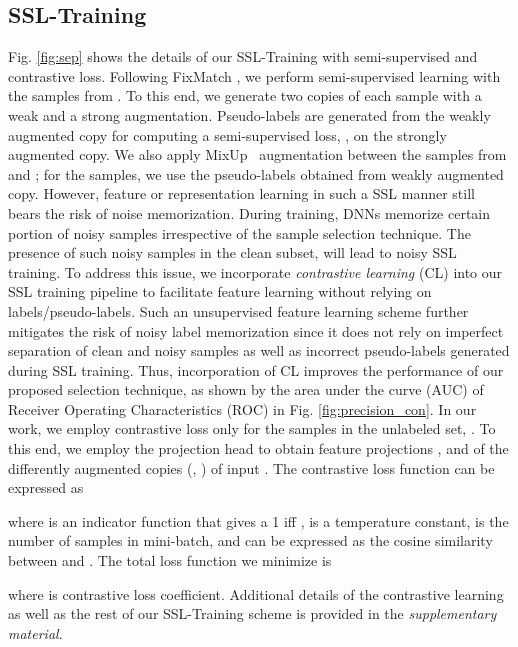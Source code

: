 \documentclass[10pt,twocolumn,letterpaper]{article}
\begin{document}
\subsection{SSL-Training}
\label{sec:ssl_train}
Fig. \ref{fig:sep} shows the details of our SSL-Training with semi-supervised and contrastive loss. Following FixMatch \cite{sohn2020fixmatch}, we perform semi-supervised learning with the samples from . To this end, we generate two copies of each sample with a weak and a strong augmentation. Pseudo-labels are generated from the weakly augmented copy for computing a semi-supervised loss, , on the strongly augmented copy. We also apply MixUp~\cite{zhang2017mixup} augmentation between the samples from  and ; for the  samples, we use the pseudo-labels obtained from weakly augmented copy. However, feature or representation learning in such a SSL manner still bears the risk of noise memorization. During training, DNNs memorize certain portion of noisy samples irrespective of the sample selection technique. The presence of such noisy samples in the clean subset, will lead to noisy SSL training. To address this issue, we incorporate \emph{contrastive learning} (CL) \cite{chen2020simple, khosla2020supervised} into our SSL training pipeline to facilitate feature learning without relying on labels/pseudo-labels. Such an unsupervised feature learning scheme further mitigates the risk of noisy label memorization since it does not rely on imperfect separation of clean and noisy samples as well as incorrect pseudo-labels generated during SSL training. Thus, incorporation of CL improves the performance of our proposed selection technique, as shown by the area under the curve (AUC) of Receiver Operating Characteristics (ROC) in Fig. \ref{fig:precision_con}. In our work, we employ contrastive loss only for the samples in the unlabeled set, . To this end, we employ the projection head  to obtain feature projections , and  of the differently augmented copies (, ) of input  . The contrastive loss function \cite{chen2020simple,khosla2020supervised} can be expressed as

where  is an indicator function that gives a 1 iff ,  is a temperature constant,  is the number of samples in mini-batch, and  can be expressed as the cosine similarity between  and . The total loss function we minimize is

where  is contrastive loss coefficient. Additional details of the contrastive learning as well as the rest of our SSL-Training scheme is provided in the {\em supplementary material}.
  
\end{document}
